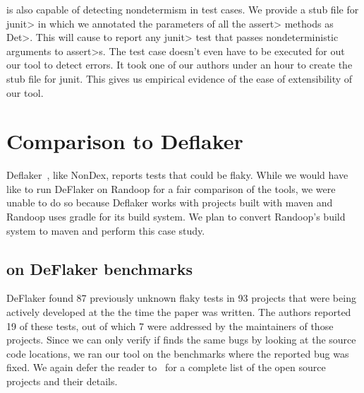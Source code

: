 \TheDeterminismChecker is also capable of detecting nondetermism in test cases. We provide a stub file
for \<junit> in which we annotated the parameters of all the \<assert> methods as \<Det>.
This will cause \TheDeterminismChecker to report any \<junit> test that passes nondeterministic arguments to 
\<assert>s. The test case doesn't even have to be executed for out our tool to detect errors.
It took one of our authors under an hour to create the stub file for junit. This gives us
empirical evidence of the ease of extensibility of our tool.


\section{Comparison to Deflaker}
Deflaker~\cite{deflaker}, like NonDex, reports tests that could be flaky. 
While we would have like to run DeFlaker on Randoop for a fair comparison of the tools,
we were unable to do so because Deflaker works with projects built with maven and Randoop
uses gradle for its build system. We plan to convert Randoop's build system to maven and 
perform this case study.

\subsection{\TheDeterminismChecker on DeFlaker benchmarks}\label{sec:deflaker-benchmarks}
DeFlaker found 87 previously unknown flaky tests in 93 projects that were being actively developed at the the time
the paper was written. The authors reported 19 of these tests, out of which 7 were addressed by the maintainers of
those projects. Since we can only verify if \TheDeterminismChecker finds the same bugs by looking at the source code
locations, we ran our tool on the benchmarks where the reported bug was fixed. We again defer the reader to~\cite{deflaker}
for a complete list of the open source projects and their details.

